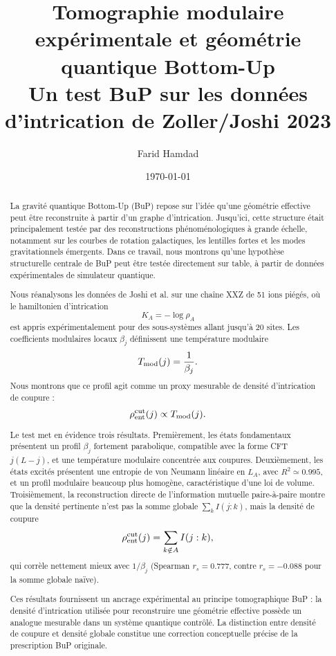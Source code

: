 \documentclass[11pt,a4paper]{article}
\title{
\textbf{Tomographie modulaire expérimentale et géométrie quantique Bottom-Up}\\
\large Un test BuP sur les données d'intrication de Zoller/Joshi 2023
}
\author{Farid Hamdad}
\date{\today}
\begin{document}
\maketitle

\begin{abstract}
La gravité quantique Bottom-Up (BuP) repose sur l'idée qu'une géométrie effective peut être reconstruite à partir d'un graphe d'intrication. Jusqu'ici, cette structure était principalement testée par des reconstructions phénoménologiques à grande échelle, notamment sur les courbes de rotation galactiques, les lentilles fortes et les modes gravitationnels émergents. Dans ce travail, nous montrons qu'une hypothèse structurelle centrale de BuP peut être testée directement sur table, à partir de données expérimentales de simulateur quantique.

Nous réanalysons les données de Joshi et al. sur une chaîne XXZ de 51 ions piégés, où le hamiltonien d'intrication
\[
K_A=-\log\rho_A
\]
est appris expérimentalement pour des sous-systèmes allant jusqu'à 20 sites. Les coefficients modulaires locaux $\beta_j$ définissent une température modulaire
\[
T_{\rm mod}(j)=\frac{1}{\beta_j}.
\]
Nous montrons que ce profil agit comme un proxy mesurable de densité d'intrication de coupure :
\[
\rho_{\rm ent}^{\rm cut}(j)
\propto
T_{\rm mod}(j).
\]

Le test met en évidence trois résultats. Premièrement, les états fondamentaux présentent un profil $\beta_j$ fortement parabolique, compatible avec la forme CFT $j(L-j)$, et une température modulaire concentrée aux coupures. Deuxièmement, les états excités présentent une entropie de von Neumann linéaire en $L_A$, avec $R^2\simeq0.995$, et un profil modulaire beaucoup plus homogène, caractéristique d'une loi de volume. Troisièmement, la reconstruction directe de l'information mutuelle paire-à-paire montre que la densité pertinente n'est pas la somme globale $\sum_k I(j:k)$, mais la densité de coupure
\[
\rho_{\rm ent}^{\rm cut}(j)=\sum_{k\notin A}I(j:k),
\]
qui corrèle nettement mieux avec $1/\beta_j$ (Spearman $r_s=0.777$, contre $r_s=-0.088$ pour la somme globale naïve).

Ces résultats fournissent un ancrage expérimental au principe tomographique BuP : la densité d'intrication utilisée pour reconstruire une géométrie effective possède un analogue mesurable dans un système quantique contrôlé. La distinction entre densité de coupure et densité globale constitue une correction conceptuelle précise de la prescription BuP originale.
\end{abstract}
\end{document}
